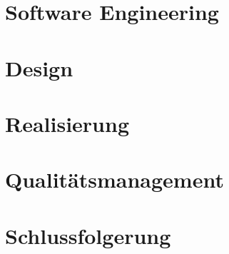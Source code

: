 \documentclass[12pt, a4paper]{report}
\begin{document}
		
	
	
	\chapter{Software Engineering}
		
	
	\chapter{Design}
	
	
	
	
	\chapter{Realisierung}
	
	
	
	\chapter{Qualitätsmanagement}
	
	
	
	\chapter{Schlussfolgerung}
	
	
\end{document}
